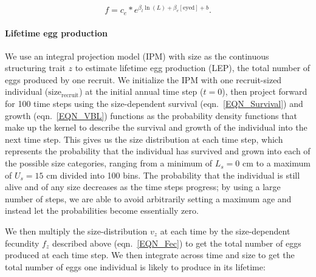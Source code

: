 \documentclass[12pt, oneside]{article}   	%
\begin{document}
\begin{equation}
f = c_e * e^{\beta_l\ln(L) + \beta_e[\text{eyed}] + b}. \label{EQN_Fec}
\end{equation}



\paragraph*{Lifetime egg production}
We use an integral projection model (IPM) \citep[e.g.][]{rees2014building} with size as the continuous structuring trait $z$ to estimate lifetime egg production (LEP), the total number of eggs produced by one recruit. We initialize the IPM with one recruit-sized individual ($\text{size}_\text{recruit}$) at the initial annual time step ($t=0$), then project forward for 100 time steps using the size-dependent survival (eqn.\ \ref{EQN_Survival}) and growth (eqn.\ \ref{EQN_VBL}) functions as the probability density functions that make up the kernel to describe the survival and growth of the individual into the next time step. This gives us the size distribution at each time step, which represents the probability that the individual has survived and grown into each of the possible size categories, ranging from a minimum of $L_s=0$ cm to a maximum of $U_s=15$ cm divided into 100 bins. The probability that the individual is still alive and of any size decreases as the time steps progress; by using a large number of steps, we are able to avoid arbitrarily setting a maximum age and instead let the probabilities become essentially zero. 

We then multiply the size-distribution $v_z$ at each time by the size-dependent fecundity $f_z$ described above (eqn.\ \ref{EQN_Fec}) to get the total number of eggs produced at each time step. We then integrate across time and size to get the total number of eggs one individual is likely to produce in its lifetime:
\end{document}
